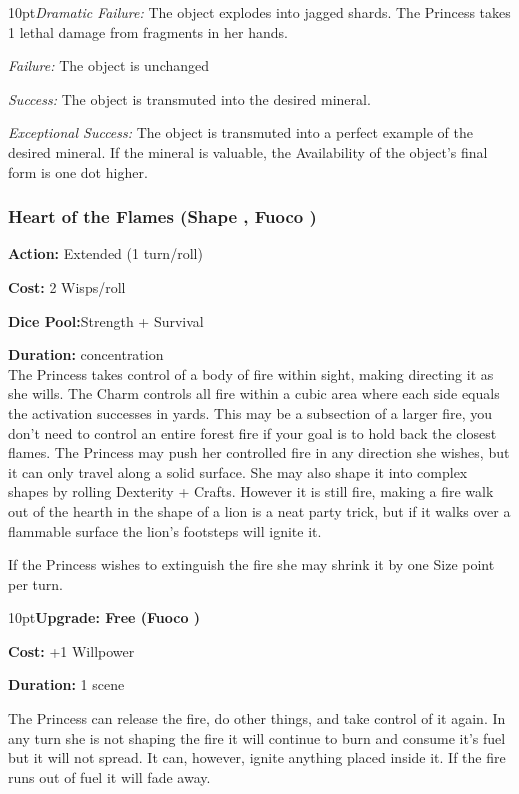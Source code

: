\begin{myindentpar}{10pt}\emph{Dramatic Failure:} The object explodes into jagged shards. The Princess takes 1 lethal damage from fragments in her hands.

\emph{Failure:} The object is unchanged

\emph{Success:} The object is transmuted into the desired mineral.

\emph{Exceptional Success:} The object is transmuted into a perfect example of the desired mineral. If the mineral is valuable, the Availability of the object’s final form is one dot higher.\end{myindentpar}

\subsubsection*{Heart of the Flames (Shape \textbullet\textbullet\textbullet, Fuoco \textbullet\textbullet)}

\noindent \textbf{Action:} Extended (1 turn/roll)

\noindent \textbf{Cost:} 2 Wisps/roll

\noindent \textbf{Dice Pool:}Strength + Survival

\noindent \textbf{Duration:} concentration \\

\noindent The Princess takes control of a body of fire within sight, making directing it as she wills. The Charm controls all fire within a cubic area where each side equals the activation successes in yards. This may be a subsection of a larger fire, you don't need to control an entire forest fire if your goal is to hold back the closest flames. The Princess may push her controlled fire in any direction she wishes, but it can only travel along a solid surface. She may also shape it into complex shapes by rolling Dexterity + Crafts. However it is still fire, making a fire walk out of the hearth in the shape of a lion is a neat party trick, but if it walks over a flammable surface the lion's footsteps will ignite it. 

If the Princess wishes to extinguish the fire she may shrink it by one Size point per turn. 

\begin{myindentpar}{10pt}\textbf{Upgrade: Free (Fuoco \textbullet\textbullet\textbullet\textbullet)}

\noindent \textbf{Cost:} +1 Willpower

\noindent \textbf{Duration:} 1 scene

The Princess can release the fire, do other things, and take control of it again. In any turn she is not shaping the fire it will continue to burn and consume it's fuel but it will not spread. It can, however, ignite anything placed inside it. If the fire runs out of fuel it will fade away.\end{myindentpar}

